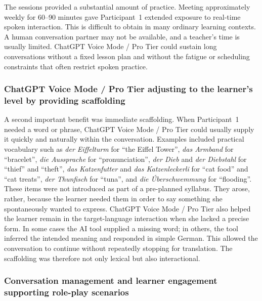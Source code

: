 \documentclass[11pt,a4paper]{article}
\begin{document}
The sessions provided a substantial amount of practice. Meeting approximately weekly for 60--90 minutes gave Participant~1 extended exposure to real-time spoken interaction. This is difficult to obtain in many ordinary learning contexts. A human conversation partner may not be available, and a teacher's time is usually limited. ChatGPT Voice Mode / Pro Tier could sustain long conversations without a fixed lesson plan and without the fatigue or scheduling constraints that often restrict spoken practice.

\subsubsection*{ChatGPT Voice Mode / Pro Tier adjusting to the learner's level by providing scaffolding}

A second important benefit was immediate scaffolding. When Participant~1 needed a word or phrase, ChatGPT Voice Mode / Pro Tier could usually supply it quickly and naturally within the conversation. Examples included practical vocabulary such as \emph{der Eiffelturm} for ``the Eiffel Tower'', \emph{das Armband} for ``bracelet'', \emph{die Aussprache} for ``pronunciation'', \emph{der Dieb} and \emph{der Diebstahl} for ``thief'' and ``theft'', \emph{das Katzenfutter} and \emph{das Katzenleckerli} for ``cat food'' and ``cat treats'', \emph{der Thunfisch} for ``tuna'', and \emph{die \'{U}berschwemmung} for ``flooding''. These items were not introduced as part of a pre-planned syllabus. They arose, rather, because the learner needed them in order to say something she spontaneously wanted to express. ChatGPT Voice Mode / Pro Tier also helped the learner remain in the target-language interaction when she lacked a precise form. In some cases the AI tool supplied a missing word; in others, the tool inferred the intended meaning and responded in simple German. This allowed the conversation to continue without repeatedly stopping for translation. The scaffolding was therefore not only lexical but also interactional.

\subsubsection*{Conversation management and learner engagement supporting role-play scenarios}
\end{document}

